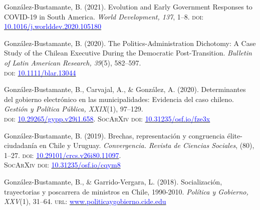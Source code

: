 \begin{publications}

\begin{benumerate}{5}
\item{\small Gonz\'alez-Bustamante, B. (2021). Evolution and Early Government Responses to COVID-19 in South America. {\itshape World Development, 137}, 1--8. {\scshape doi:} \href{https://doi.org/10.1016/j.worlddev.2020.105180}{\textcolor{blue}{10.1016/j.worlddev.2020.105180}}}\vspace{1mm}

\item{\small Gonz\'alez-Bustamante, B. (2020). The Politics-Administration Dichotomy: A Case Study of the Chilean Executive During the Democratic Post-Transition. {\itshape Bulletin of Latin American Research, 39}(5), 582--597. \\ {\scshape doi}: \href{https://doi.org/10.1111/blar.13044}{\textcolor{blue}{10.1111/blar.13044}}}\vspace{1mm}

\item{\small Gonz\'alez-Bustamante, B., Carvajal, A., \& Gonz\'alez, A. (2020). Determinantes del gobierno electrónico en las municipalidades: Evidencia del caso chileno. {\itshape Gesti\'on y Pol\'itica P\'ublica, XXIX}(1), 97--129. \\ {\scshape doi:} \href{http://dx.doi.org/10.29265/gypp.v29i1.658}{\textcolor{blue}{10.29265/gypp.v29i1.658}}. {\scshape {\footnotesize SocArXiv} doi}: \href{https://doi.org/10.31235/osf.io/fze3x}{\textcolor{blue}{10.31235/osf.io/fze3x}}} \vspace{1mm}

\item{\small Gonz\'alez-Bustamante, B. (2019). Brechas, representación y congruencia élite-ciudadanía en Chile y Uruguay. {\itshape Convergencia. Revista de Ciencias Sociales}, (80), 1--27. {\scshape doi}: \href{https://doi.org/10.29101/crcs.v26i80.11097}{\textcolor{blue}{10.29101/crcs.v26i80.11097}}. \\ {\scshape {\footnotesize SocArXiv} doi}: \href{https://doi.org/10.31235/osf.io/cqym8}{\textcolor{blue}{10.31235/osf.io/cqym8}}}\vspace{1mm}

\item{\small Gonz\'alez-Bustamante, B., \& Garrido-Vergara, L. (2018). Socialización, trayectorias y poscarrera de ministros en Chile, 1990-2010. {\itshape Pol\'itica y Gobierno, XXV}(1), 31--64. {\scshape url}: \href{http://www.politicaygobierno.cide.edu/index.php/pyg/article/view/1080}{\textcolor{blue}{www.politicaygobierno.cide.edu}}}\vspace{1mm}
\end{benumerate}

\end{publications}

